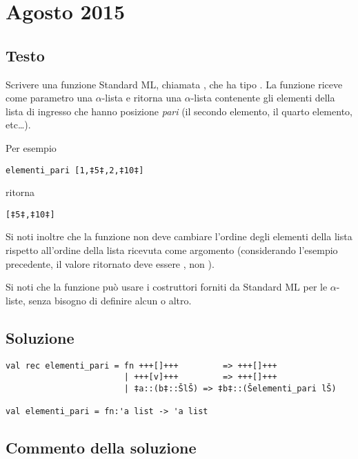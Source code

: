 \section{Agosto 2015}

\subsection{Testo}

Scrivere una funzione Standard ML, chiamata , che ha tipo . La funzione riceve come parametro una \(\alpha\)-lista e ritorna una \(\alpha\)-lista contenente gli elementi della lista di ingresso che hanno posizione \emph{pari} (il secondo elemento, il quarto elemento, etc\dots).

\medskip
Per esempio

\begin{lstlisting}[style = SML]
elementi_pari [1,‡5‡,2,‡10‡]
\end{lstlisting}

ritorna

\begin{lstlisting}[style = SML]
[‡5‡,‡10‡]
\end{lstlisting}

\medskip
Si noti inoltre che la funzione  non deve cambiare l'ordine degli elementi della lista rispetto all'ordine della lista ricevuta come argomento (considerando l'esempio precedente, il valore ritornato deve essere \sml{[5,10]}, non \sml{[10,5]}).

\medskip
Si noti che la funzione  può usare i costruttori forniti da Standard ML per le \(\alpha\)-liste, senza bisogno di definire alcun  o altro.

\subsection{Soluzione}

\begin{lstlisting}[style = SML, caption={Definizione della funzione \sml{elementi\_pari}}]
val rec elementi_pari = fn +++[]+++         => +++[]+++
						| +++[v]+++         => +++[]+++
						| ‡a::(b‡::ŠlŠ) => ‡b‡::(Šelementi_pari lŠ)

val elementi_pari = fn:'a list -> 'a list
\end{lstlisting}

\subsection{Commento della soluzione}

